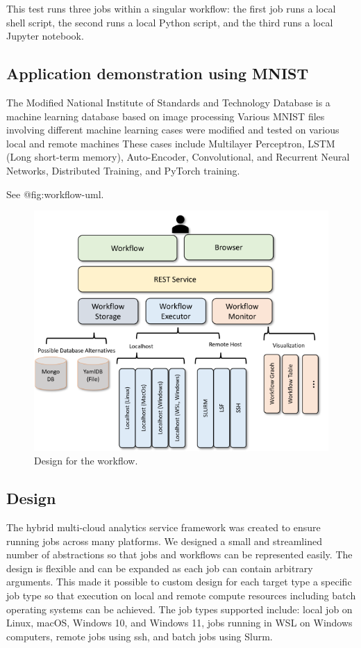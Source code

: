 This test runs three jobs within a singular workflow: the first job runs
a local shell script, the second runs a local Python script, and the
third runs a local Jupyter notebook.

\subsection{Application demonstration using
MNIST}\label{application-demonstration-using-mnist}

The Modified National Institute of Standards and Technology Database is
a machine learning database based on image processing Various MNIST
files involving different machine learning cases were modified and
tested on various local and remote machines These cases include
Multilayer Perceptron, LSTM (Long short-term memory), Auto-Encoder,
Convolutional, and Recurrent Neural Networks, Distributed Training, and
PyTorch training.

See @fig:workflow-uml.

\begin{figure}
\centering
\includegraphics{images/workflow-uml.png}
\caption{Design for the workflow.}\label{fig:workflow-uml}
\end{figure}

\subsection{Design}\label{design}

The hybrid multi-cloud analytics service framework was created to ensure
running jobs across many platforms. We designed a small and streamlined
number of abstractions so that jobs and workflows can be represented
easily. The design is flexible and can be expanded as each job can
contain arbitrary arguments. This made it possible to custom design for
each target type a specific job type so that execution on local and
remote compute resources including batch operating systems can be
achieved. The job types supported include: local job on Linux, macOS,
Windows 10, and Windows 11, jobs running in WSL on Windows computers,
remote jobs using ssh, and batch jobs using Slurm.

